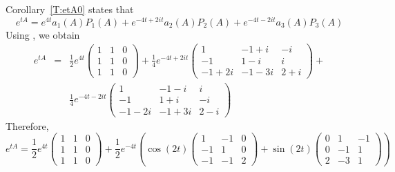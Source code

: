 \documentclass{ximera}
\begin{document}
Corollary~\ref{T:etA0} states that
\[
e^{tA} = e^{4t}a_1(A)P_1(A)+e^{-4t+2it}a_2(A)P_2(A)
	+e^{-4t-2it}a_3(A)P_3(A)
\]
Using \Matlabp, we obtain
\begin{eqnarray*}
e^{tA} & = & \frac{1}{2}e^{4t} 
\left(\begin{array}{rrr}
     1    &      1    &       0  \\    
     1    &      1    &       0  \\    
     1    &      1    &       0      
\end{array}\right)  + 
\frac{1}{4}e^{-4t+2it}
\left(\begin{array}{ccc}
     1     &    -1      +    i     &      -i   \\ 
    -1     &     1      -    i     &       i    \\
 -1  + 2i  &    -1      -   3i    &     2 + i   
\end{array}\right) + \\
& & \frac{1}{4}e^{-4t-2it}
\left(\begin{array}{ccc}
     1     &    -1      -    i     &       i   \\ 
    -1     &     1      +    i     &      -i    \\
 -1  - 2i  &    -1      +    3i    &     2 - i   
\end{array}\right)
\end{eqnarray*}
Therefore,
\[
e^{tA} = \frac{1}{2}e^{4t}
\left(\begin{array}{rrr}
     1    &      1    &       0  \\
     1    &      1    &       0  \\
     1    &      1    &       0
\end{array}\right)  
+ \frac{1}{2}e^{-4t}\left(\cos(2t)\left(\begin{array}{rrr}
1 & -1 & 0\\ -1 & 1 & 0\\ -1 & -1 & 2 \end{array}\right)+\sin(2t)
\left(\begin{array}{rrr}
0 & 1 & -1\\ 0 & -1 & 1\\ 2 & -3 & 1 \end{array}\right)\right)
\]
\end{document}
